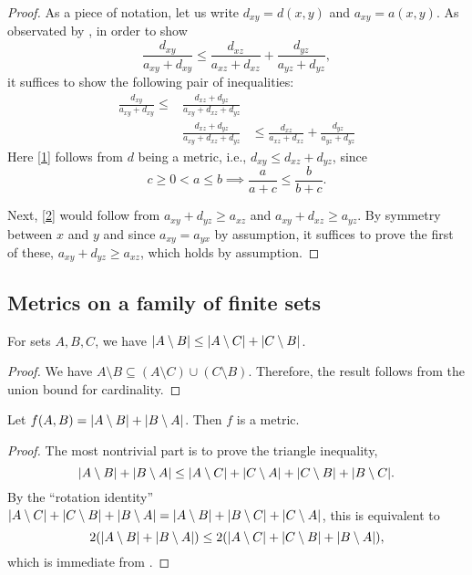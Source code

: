 		\begin{proof}
			As a piece of notation, let us write $d_{xy}=d(x,y)$ and $a_{xy}=a(x,y)$.
			As observated by \cite{210750}, in order to show
			\[
				\frac{d_{xy}}{a_{xy}+d_{xy}}\le  \frac{d_{xz}}{a_{xz}+d_{xz}} + \frac{d_{yz}}{a_{yz}+d_{yz}},
			\]
			it suffices to show the following pair of inequalities:
			\begin{eqnarray}
				\frac{d_{xy}}{a_{xy}+d_{xy}}\le &\frac{d_{xz}+d_{yz}}{a_{xy}+d_{xz}+d_{yz}}& \label{1}\\
				&\frac{d_{xz}+d_{yz}}{a_{xy}+d_{xz}+d_{yz}}& \le \frac{d_{xz}}{a_{xz}+d_{xz}} + \frac{d_{yz}}{a_{yz}+d_{yz}}\label{2}
			\end{eqnarray}
			Here \eqref{1} follows from $d$ being a metric, i.e., $d_{xy}\le d_{xz}+d_{yz}$, since
			\[
				c\ge 0<a\le b\implies \frac{a}{a+c}\le \frac{b}{b+c}.
			\]

			Next, \eqref{2} would follow from $a_{xy}+d_{yz}\ge a_{xz}$ and $a_{xy}+d_{xz}\ge a_{yz}$.
			By symmetry between $x$ and $y$ and since $a_{xy}=a_{yx}$ by assumption,
			it suffices to prove the first of these, $a_{xy}+d_{yz}\ge a_{xz}$, which holds by assumption.
		\end{proof}
        \subsection{Metrics on a family of finite sets}
        \begin{lemma}\label{union-bound}
			\leanok
            For sets $A,B,C$, we have
            $\lvert A\setminus B\rvert\le \lvert A\setminus C\rvert+\lvert C\setminus B\rvert$.
        \end{lemma}
        \begin{proof}
            We have $A\setminus B\subseteq (A\setminus C)\cup (C\setminus B)$. Therefore, the result follows from the union bound for cardinality.
        \end{proof}
        \begin{lemma}\label{jaccard-numerator}
             Let $f(A,B)=\lvert A\setminus B\rvert+\lvert B\setminus A\rvert$. Then $f$ is a metric.
        \end{lemma}
        \begin{proof}
            The most nontrivial part is to prove the triangle inequality,
			\[
			\lvert A\setminus B\rvert+\lvert B\setminus A\rvert\le
			\lvert A\setminus C\rvert+\lvert C\setminus A\rvert
			+
			\lvert C\setminus B\rvert+\lvert B\setminus C\rvert.
			\]
			By the ``rotation identity'' $\lvert A\setminus C\rvert+\lvert C\setminus B\rvert+\lvert B\setminus A\rvert=
			\lvert A\setminus B\rvert+\lvert B\setminus C\rvert+\lvert C\setminus A\rvert$, this is equivalent to
			\[
			2(\lvert A\setminus B\rvert+\lvert B\setminus A\rvert)\le
			2(\lvert A\setminus C\rvert
			+
			\lvert C\setminus B\rvert
			+
			\lvert B\setminus A\rvert),
			\]
			which is immediate from .
        \end{proof}

